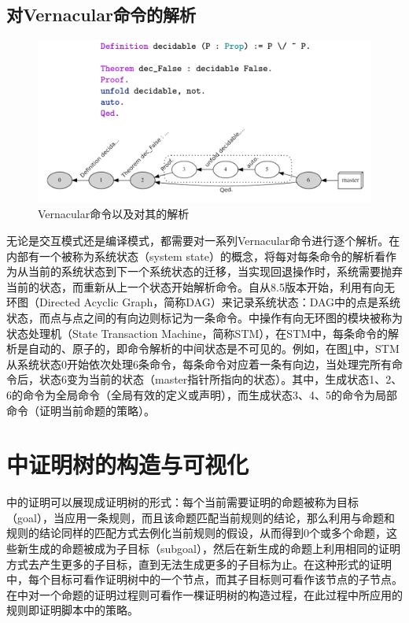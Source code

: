 \subsection{对Vernacular命令的解析}
\begin{figure}[h!]
	\centering
	\includegraphics[width=12cm]{Img/coq_stm.png}
	\caption{Vernacular命令以及对其的解析}
	\label{coq:stm}
\end{figure}

无论是交互模式还是编译模式，都需要对一系列Vernacular命令进行逐个解析。在内部有一个被称为系统状态（system state）的概念，将每对每条命令的解析看作为从当前的系统状态到下一个系统状态的迁移，当实现回退操作时，系统需要抛弃当前的状态，而重新从上一个状态开始解析命令。自从8.5版本开始，利用有向无环图（Directed Acyclic Graph，简称DAG）来记录系统状态：DAG中的点是系统状态，而点与点之间的有向边则标记为一条命令。中操作有向无环图的模块被称为状态处理机（State Transaction Machine，简称STM），在STM中，每条命令的解析是自动的、原子的，即命令解析的中间状态是不可见的。例如，在图\ref{coq:stm}中，STM从系统状态0开始依次处理6条命令，每条命令对应着一条有向边，当处理完所有命令后，状态6变为当前的状态（master指针所指向的状态）。其中，生成状态1、2、6的命令为全局命令（全局有效的定义或声明），而生成状态3、4、5的命令为局部命令（证明当前命题的策略）。




\section{中证明树的构造与可视化}
中的证明可以展现成证明树的形式：每个当前需要证明的命题被称为目标（goal），当应用一条规则，而且该命题匹配当前规则的结论，那么利用与命题和规则的结论同样的匹配方式去例化当前规则的假设，从而得到0个或多个命题，这些新生成的命题被成为子目标（subgoal），然后在新生成的命题上利用相同的证明方式去产生更多的子目标，直到无法生成更多的子目标为止。在这种形式的证明中，每个目标可看作证明树中的一个节点，而其子目标则可看作该节点的子节点。在中对一个命题的证明过程则可看作一棵证明树的构造过程，在此过程中所应用的规则即证明脚本中的策略。

